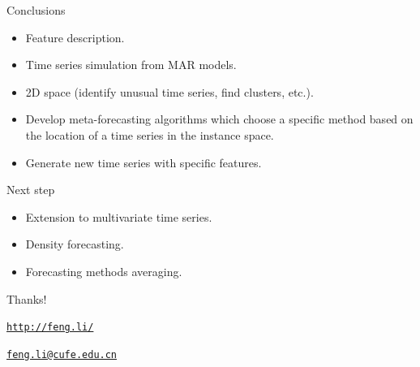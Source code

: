 \documentclass[11pt,ignorenonframetext,compress]{beamer}
\providecommand{\tightlist}{%
  \setlength{\itemsep}{0pt}\setlength{\parskip}{0pt}}
\begin{document}
\begin{frame}{Conclusions}

  \begin{itemize}
    \tightlist
  \item
    Feature description.
  \item
    Time series simulation from MAR models.
  \item
    2D space (identify unusual time series, find clusters, etc.).
  \item
    Develop meta-forecasting algorithms which choose a specific method
    based on the location of a time series in the instance space.
  \item
    Generate new time series with specific features.
  \end{itemize}

\end{frame}

\begin{frame}{Next step}

  \begin{itemize}
    \tightlist
  \item Extension to multivariate time series.

  \item Density forecasting.
  \item Forecasting methods averaging.
  \end{itemize}

\end{frame}


\begin{frame}%
  \tiny
  
  


\end{frame}
\begin{frame}{Thanks!}

  \Large \texttt{\url{http://feng.li/}}

  \Large \texttt{\url{feng.li@cufe.edu.cn}}

\end{frame}
\end{document}
